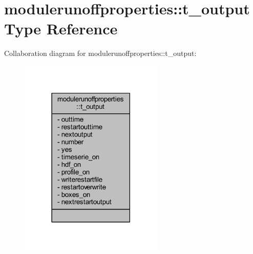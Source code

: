 \hypertarget{structmodulerunoffproperties_1_1t__output}{}\section{modulerunoffproperties\+:\+:t\+\_\+output Type Reference}
\label{structmodulerunoffproperties_1_1t__output}


Collaboration diagram for modulerunoffproperties\+:\+:t\+\_\+output\+:\nopagebreak
\begin{figure}[H]
\begin{center}
\leavevmode
\includegraphics[width=194pt]{structmodulerunoffproperties_1_1t__output__coll__graph}
\end{center}
\end{figure}
